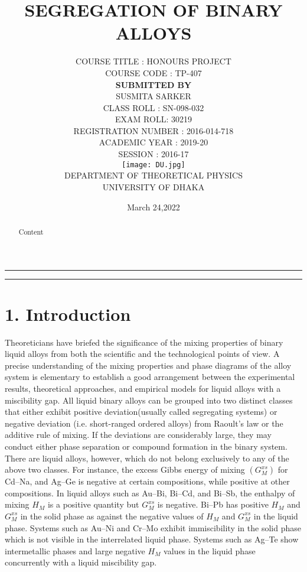 \documentclass[12pt]{article}
\title{\color{blue} \Huge{ SEGREGATION OF BINARY ALLOYS}}
\author{ COURSE TITLE : HONOURS PROJECT \\ COURSE CODE : TP-407 \\ [20PT] \textbf{SUBMITTED BY}
 \\ [5PT] \Large SUSMITA SARKER \\ \Large CLASS ROLL : SN-098-032 \\ \Large EXAM ROLL: 30219 \\
  \Large REGISTRATION NUMBER : 2016-014-718 \\ \Large  ACADEMIC YEAR :  2019-20 \\
   \Large  SESSION : 2016-17
\\ [10pt] 
\texttt{[image: DU.jpg]} \\ [10pt] \Large DEPARTMENT OF THEORETICAL PHYSICS \\ UNIVERSITY OF DHAKA 
}
\date{March 24,2022}
\newcommand*{\1}{\hspace{1pt}}
\begin{document}
	
	
\pagebreak

\rule{\textwidth}{0.5pt}
\begin{abstract}
Content
\end{abstract}

\rule{\textwidth}{0.5pt}
\newpage

    \section*{1. Introduction}
    Theoreticians have briefed the significance of the mixing properties of binary liquid alloys 
    from both the scientific and the technological points of view. A precise understanding of 
    the mixing properties and phase diagrams of the alloy system is elementary to establish a 
    good arrangement between the experimental results, theoretical approaches, and empirical 
    models for liquid alloys with a miscibility gap.
    All liquid binary alloys can be grouped into two distinct classes that either exhibit 
    positive deviation(usually called segregating systems) or negative deviation (i.e. 
    short-ranged ordered alloys) from Raoult's law or the additive rule of mixing. If the 
    deviations are considerably large, they may conduct either phase separation or compound 
    formation in the binary system. \\

        There are liquid alloys, however, which do not belong exclusively to any of the above 
    two classes. For instance, the excess Gibbs energy of mixing $(G ^{xs} _{M} )$ for Cd–Na, and 
    Ag–Ge is negative at certain compositions, while positive at other compositions. In 
    liquid alloys such as Au–Bi, Bi–Cd, and Bi–Sb, the enthalpy of mixing $H_{M}$ is a 
    positive quantity but $G^{xs} _{M}$  is negative. Bi–Pb has positive $H_{M}$ and $G^{xs}_{M} $ in the 
    solid phase as against the negative values of $H_{M}$ and $G^{xs} _{M}$ in the liquid phase. 
    Systems such as Au–Ni and Cr–Mo exhibit immiscibility in the solid phase which is not 
    visible in the interrelated liquid phase. Systems such as Ag–Te show intermetallic 
    phases and large negative $H_{M}$ values in the liquid phase concurrently with a liquid 
    miscibility gap. \\
\end{document}

